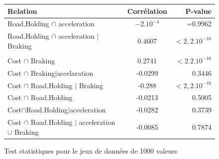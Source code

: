 \documentclass[a4paper]{article}
\begin{document}
\begin{figure}[H]
\begin{center}
\begin{tabular}{|l|c|r|}
  \hline
  Relation & Corrélation & P-value \\
  \hline
   Road.Holding $\cap$  acceleration&$-2.10^{-4}$& =0.9962  \\
   Road.Holding $\cap$  acceleration $|$Braking &$0.4607$& $<2,2.10^{-16}$  \\
\hline \hline \\
Cost $\cap$ Braking &0.2741&$<2.2.10^{-16}$\\
Cost $\cap$ Braking$|$accelaration &-0.0299&0.3446\\
\hline \hline 
Cost $\cap$ Road.Holding $|$ Braking&-0.288&$ < 2,2.10^{-16}$\\
Cost $\cap$ Road.Holding &-0.0213&0.5005\\
Cost$\cap$Road.Holding$|$acceleration&-0.0282&0.3739\\
Cost $\cap$ Road.Holding $|$ acceleration $\cup$ Braking&-0.0085&0.7874\\
\hline
\end{tabular}
\end{center}
\caption{Test statistiques pour le jeux de données de 1000 valeurs }
\label{tab1_1000}
\end{figure}
\end{document}
